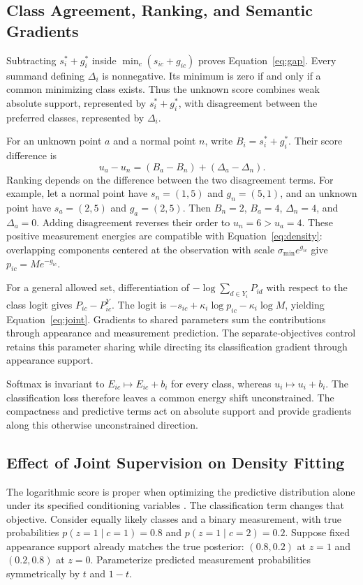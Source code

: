 \documentclass{article}
\begin{document}
\subsection{Class Agreement, Ranking, and Semantic Gradients}
Subtracting $s_i^*+g_i^*$ inside $\min_c(s_{ic}+g_{ic})$ proves Equation~\eqref{eq:gap}. Every summand defining $\Delta_i$ is nonnegative. Its minimum is zero if and only if a common minimizing class exists. Thus the unknown score combines weak absolute support, represented by $s_i^*+g_i^*$, with disagreement between the preferred classes, represented by $\Delta_i$.

For an unknown point $a$ and a normal point $n$, write $B_i=s_i^*+g_i^*$. Their score difference is
\begin{equation}
 u_a-u_n=(B_a-B_n)+(\Delta_a-\Delta_n).
 \label{eq:ranking}
\end{equation}
Ranking depends on the difference between the two disagreement terms. For example, let a normal point have $s_n=(1,5)$ and $g_n=(5,1)$, and an unknown point have $s_a=(2,5)$ and $g_a=(2,5)$. Then $B_n=2$, $B_a=4$, $\Delta_n=4$, and $\Delta_a=0$. Adding disagreement reverses their order to $u_n=6>u_a=4$. These positive measurement energies are compatible with Equation~\eqref{eq:density}: overlapping components centered at the observation with scale $\sigma_{\min}e^{g_{ic}}$ give $p_{ic}=Me^{-g_{ic}}$.

For a general allowed set, differentiation of $-\log\sum_{d\in Y_i}P_{id}$ with respect to the class logit gives $P_{ic}-P^Y_{ic}$. The logit is $-s_{ic}+\kappa_i\log p_{ic}-\kappa_i\log M$, yielding Equation~\eqref{eq:joint}. Gradients to shared parameters sum the contributions through appearance and measurement prediction. The separate-objectives control retains this parameter sharing while directing its classification gradient through appearance support.

Softmax is invariant to $E_{ic}\mapsto E_{ic}+b_i$ for every class, whereas $u_i\mapsto u_i+b_i$. The classification loss therefore leaves a common energy shift unconstrained. The compactness and predictive terms act on absolute support and provide gradients along this otherwise unconstrained direction.

\subsection{Effect of Joint Supervision on Density Fitting}
The logarithmic score is proper when optimizing the predictive distribution alone under its specified conditioning variables \citep{proper}. The classification term changes that objective. Consider equally likely classes and a binary measurement, with true probabilities $p(z=1\mid c=1)=0.8$ and $p(z=1\mid c=2)=0.2$. Suppose fixed appearance support already matches the true posterior: $(0.8,0.2)$ at $z=1$ and $(0.2,0.8)$ at $z=0$. Parameterize predicted measurement probabilities symmetrically by $t$ and $1-t$.
\end{document}
